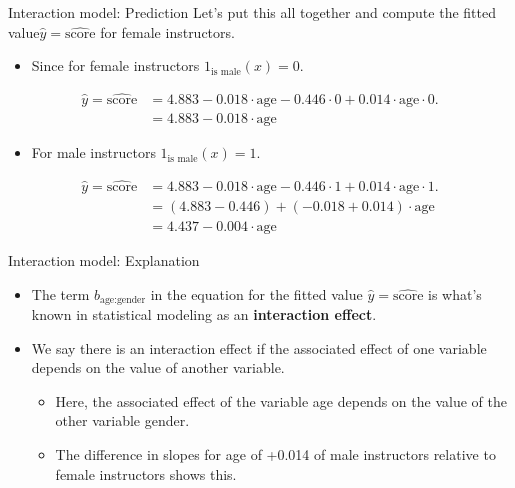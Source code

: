 \documentclass[
  ignorenonframetext,
]{beamer}
\providecommand{\tightlist}{%
  \setlength{\itemsep}{0pt}\setlength{\parskip}{0pt}}
\begin{document}
\begin{frame}{Interaction model: Prediction}
\label{interaction-model-prediction-1}
Let's put this all together and compute the fitted
value\(\hat{y}=\widehat{\text{score}}\) for female instructors.

\begin{itemize}
\tightlist
\item
  Since for female instructors \(1_{\text{is male}}(x)=0\).
\end{itemize}

\[\begin{array}{ll}
\hat{y}=\widehat{\text{score}}&=4.883-0.018\cdot \text{age}-0.446\cdot 0+0.014\cdot \text{age}\cdot 0.\\
&=4.883-0.018\cdot \text{age}
\end{array}\]

\begin{itemize}
\tightlist
\item
  For male instructors \(1_{\text{is male}}(x)=1\).
\end{itemize}

\[\begin{array}{ll}
\hat{y}=\widehat{\text{score}}&=4.883-0.018\cdot \text{age}-0.446\cdot 1+0.014\cdot \text{age}\cdot 1.\\
&=(4.883-0.446)+(-0.018+0.014)\cdot \text{age}\\
&=4.437-0.004\cdot \text{age}
\end{array}\]
\end{frame}

\begin{frame}{Interaction model: Explanation}
\label{interaction-model-explanation}
\begin{itemize}
\item
  The term \(b_{\text{age:gender}}\) in the equation for the fitted
  value \(\hat{y}=\widehat{\text{score}}\) is what's known in
  statistical modeling as an \textbf{interaction effect}.
\item
  We say there is an interaction effect if the associated effect of one
  variable depends on the value of another variable.

  \begin{itemize}
  \tightlist
  \item
    Here, the associated effect of the variable age depends on the value
    of the other variable gender.
  \item
    The difference in slopes for age of +0.014 of male instructors
    relative to female instructors shows this.
  \end{itemize}
\end{itemize}
\end{frame}
\end{document}
